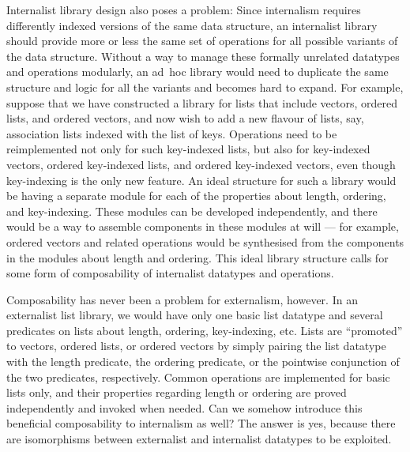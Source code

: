 Internalist library design also poses a problem:
Since internalism requires differently indexed versions of the same data structure, an internalist library should provide more or less the same set of operations for all possible variants of the data structure.
Without a way to manage these formally unrelated datatypes and operations modularly, an ad~hoc library would need to duplicate the same structure and logic for all the variants and becomes hard to expand.
For example, suppose that we have constructed a library for lists that include vectors, ordered lists, and ordered vectors, and now wish to add a new flavour of lists, say, association lists indexed with the list of keys.
Operations need to be reimplemented not only for such key-indexed lists, but also for key-indexed vectors, ordered key-indexed lists, and ordered key-indexed vectors, even though key-indexing is the only new feature.
An ideal structure for such a library would be having a separate module for each of the properties about length, ordering, and key-indexing.
These modules can be developed independently, and there would be a way to assemble components in these modules at will --- for example, ordered vectors and related operations would be synthesised from the components in the modules about length and ordering.
This ideal library structure calls for some form of composability of internalist datatypes and operations.

Composability has never been a problem for externalism, however.
In an externalist list library, we would have only one basic list datatype and several predicates on lists about length, ordering, key-indexing, etc.
Lists are ``promoted'' to vectors, ordered lists, or ordered vectors by simply pairing the list datatype with the length predicate, the ordering predicate, or the pointwise conjunction of the two predicates, respectively.
Common operations are implemented for basic lists only, and their properties regarding length or ordering are proved independently and invoked when needed.
Can we somehow introduce this beneficial composability to internalism as well?
The answer is yes, because there are isomorphisms between externalist and internalist datatypes to be exploited.


